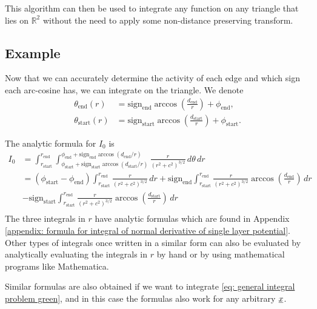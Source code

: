 \documentclass[../paper.tex]{subfiles}
\begin{document}
This algorithm can then be used to integrate any function on any triangle that lies on $\mathbb{R}^2$ without the need to apply some non-distance preserving transform. 

\subsection{Example}

Now that we can accurately determine the activity of each edge and which sign each arc-cosine has, we can integrate on the triangle. We denote
\begin{equation*}
\begin{split}
    \theta_{\mathrm{end}}(r) &= \mathrm{sign}_\mathrm{end}\arccos\left(\frac{d_\mathrm{end}}{r}\right) + \phi_\mathrm{end},\\
    \theta_{\mathrm{start}}(r) &= \mathrm{sign}_\mathrm{start}\arccos\left(\frac{d_\mathrm{start}}{r}\right) + \phi_\mathrm{start}.
\end{split}
\end{equation*}

The analytic formula for $I_0$ is 
\begin{equation*}
\begin{split}
    I_0  & = \int_{r_\mathrm{start}}^{r_\mathrm{end}} \int_{\phi_\mathrm{start} + \mathrm{sign}_\mathrm{start}\arccos\left(d_\mathrm{start}/r\right)}^{\phi_\mathrm{end} + \mathrm{sign}_\mathrm{end}\arccos\left(d_\mathrm{end}/r\right)} \frac{r}{(r^2 + c^2)^{3/2}}\, d\theta \, dr \\
    & = (\phi_\mathrm{start} - \phi_\mathrm{end}) \int_{r_\mathrm{start}}^{r_\mathrm{end}} \frac{r}{(r^2+c^2)^{3/2}}\, dr + \mathrm{sign}_\mathrm{end}\int_{r_\mathrm{start}}^{r_\mathrm{end}} \frac{r}{(r^2 + c^2)^{3/2}}\arccos\left(\frac{d_\mathrm{end}}{r}\right)\, dr \\
    & - \mathrm{sign}_\mathrm{start}\int_{r_\mathrm{start}}^{r_\mathrm{end}} \frac{r}{(r^2 + c^2)^{3/2}}\arccos\left(\frac{d_\mathrm{start}}{r}\right)\, dr \\
\end{split}
\end{equation*}
The three integrals in $r$ have analytic formulas which are found in Appendix \ref{appendix: formula for integral of normal derivative of single layer potential}. Other types of integrals once written in a similar form can also be evaluated by analytically evaluating the integrals in $r$ by hand or by using mathematical programs like Mathematica. 

Similar formulas are also obtained if we want to integrate \autoref{eq: general integral problem green}, and in this case the formulas also work for any arbitrary $\underline{x}$.
\end{document}

